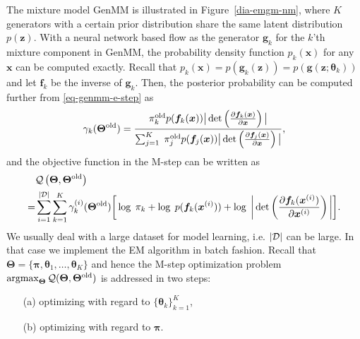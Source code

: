 The mixture model GenMM is illustrated in Figure~\ref{dia-emgm-nm},
where $K$ generators with a certain prior distribution share the same
latent distribution $p(\bm{z})$. With a neural network based flow as the generator $\bm{g}_k$ for the $k$'th mixture component in GenMM, the probability density function $p_k(\bm{x})$ for any
$\bm{x}$ can be computed exactly. Recall that $p_k(\bm{x}) =  p(\bm{g}_k(\bm{z})) =p(\bm{g}(\bm{z};\bm{\theta}_k))$ and let $\bm{f}_k$ be the inverse of $\bm{g}_k$. Then, the posterior probability can be computed further from \eqref{eq-genmm-e-step} as
\begin{align}\label{eq-genmm-gamma}
  \gamma_k({\bm{\Theta}}^{\mathrm{old}}) = \frac{\pi_k^{\mathrm{old}} p(\bm{f}_k(\bm{x})) \big|\det\left( \frac{ \partial \bm{f}_k(\bm{x})}{\partial \bm{x}} \right)\big|}{\sum_{j=1}^K\; \pi_j^{\mathrm{old}} p(\bm{f}_j(\bm{x})) \big|\det\left( \frac{ \partial \bm{f}_j(\bm{x})}{\partial \bm{x}} \right)\big|},
\end{align}
and the objective function in the M-step can be written as
\begin{align}\label{eq-genmm-obj}
  &\mathcal{Q}\left(\bm{\Theta},\bm{\Theta}^{\mathrm{old}}\right)  \nonumber\\
  =&\sum_{i=1}^{| \mathcal{D} |} \sum_{k=1}^{K}\gamma_k^{(i)}(\bm{\Theta}^{\mathrm{old}})\bigg[ \log\;\pi_k +\log\;p(\bm{f}_k(\bm{x}^{(i)})) + \log\;\bigg|\det\left(\frac{ \partial \bm{f}_k(\bm{x}^{(i)})}{\partial \bm{x}^{(i)}} \right)\bigg|\bigg].
\end{align}
We usually deal with a large dataset for model learning, i.e. $| \mathcal{D} |$ can be large. In that case we implement the EM algorithm in batch fashion. 
Recall that $ \bm{\Theta}= \{\bm{\pi},\bm{\theta}_1, \dots, \bm{\theta}_K \}$ and hence the M-step optimization problem $\operatorname{argmax}_{\bm{\Theta}} \mathcal{Q} (\bm{\Theta},\bm{\Theta}^{\mathrm{old}})$ is addressed in two steps:
\begin{itemize}
\item[(a)] optimizing with regard to $\{ \bm{\theta}_k \}_{k=1}^{K}$,
\item[(b)] optimizing with regard to $\bm{\pi}$.
\end{itemize}

